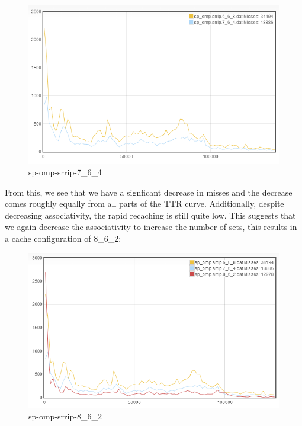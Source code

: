 \begin{figure}
\begin{center}
\includegraphics[width={0.9\columnwidth}]{images/sp_omp-srrip-7_6_4}
\end{center}
\caption{sp-omp-srrip-7\_6\_4}
\label{7_6_4}
\end{figure}

From this, we see that we have a signficant decrease in misses and the decrease comes roughly equally from all parts of the TTR curve. Additionally, despite decreasing associativity, the rapid recaching is still quite low. This suggests that we again decrease the associativity to increase the number of sets, this results in a cache configuration of 8\_6\_2:

\begin{figure}
\begin{center}
\includegraphics[width={0.9\columnwidth}]{images/sp_omp-srrip-8_6_2}
\end{center}
\caption{sp-omp-srrip-8\_6\_2}
\label{8_6_2}
\end{figure}

